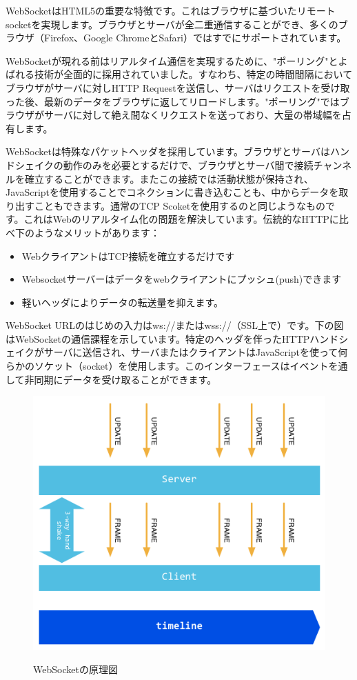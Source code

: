 WebSocketはHTML5の重要な特徴です。これはブラウザに基づいたリモートsocketを実現します。ブラウザとサーバが全二重通信することができ、多くのブラウザ（Firefox、Google ChromeとSafari）ではすでにサポートされています。

WebSocketが現れる前はリアルタイム通信を実現するために、"ポーリング"とよばれる技術が全面的に採用されていました。すなわち、特定の時間間隔においてブラウザがサーバに対しHTTP Requestを送信し、サーバはリクエストを受け取った後、最新のデータをブラウザに返してリロードします。"ポーリング"ではブラウザがサーバに対して絶え間なくリクエストを送っており、大量の帯域幅を占有します。

WebSocketは特殊なパケットヘッダを採用しています。ブラウザとサーバはハンドシェイクの動作のみを必要とするだけで、ブラウザとサーバ間で接続チャンネルを確立することができます。またこの接続では活動状態が保持され、JavaScriptを使用することでコネクションに書き込むことも、中からデータを取り出すこともできます。通常のTCP Scoketを使用するのと同じようなものです。これはWebのリアルタイム化の問題を解決しています。伝統的なHTTPに比べ下のようなメリットがあります：

\begin{itemize}
  \item WebクライアントはTCP接続を確立するだけです
  \item Websocketサーバーはデータをwebクライアントにプッシュ(push)できます
  \item 軽いヘッダによりデータの転送量を抑えます。
\end{itemize}

WebSocket URLのはじめの入力はws://またはwss://（SSL上で）です。下の図はWebSocketの通信課程を示しています。特定のヘッダを伴ったHTTPハンドシェイクがサーバに送信され、サーバまたはクライアントはJavaScriptを使って何らかのソケット（socket）を使用します。このインターフェースはイベントを通して非同期にデータを受け取ることができます。

\begin{figure}[H]
  \includegraphics[width=14cm]{8.2.websocket.png}
  \label{図8.2}
   \caption{WebSocketの原理図}
\end{figure}



